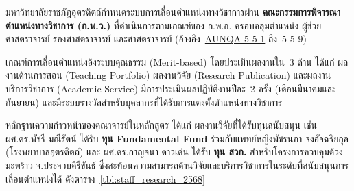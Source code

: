 
มหาวิทยาลัยราชภัฏอุตรดิตถ์กำหนดระบบการเลื่อนตำแหน่งทางวิชาการผ่าน \textbf{คณะกรรมการพิจารณาตำแหน่งทางวิชาการ (ก.พ.ว.)} ที่ดำเนินการตามเกณฑ์ของ ก.พ.อ. ครอบคลุมตำแหน่ง ผู้ช่วยศาสตราจารย์ รองศาสตราจารย์ และศาสตราจารย์ (อ้างอิง~\hyperlink{ref:AUNQA-5-5-1}{AUNQA-5-5-1} ถึง~5-5-9)

เกณฑ์การเลื่อนตำแหน่งอิงระบบคุณธรรม (Merit-based) โดยประเมินผลงานใน~3 ด้าน ได้แก่ ผลงานด้านการสอน (Teaching Portfolio) ผลงานวิจัย (Research Publication) และผลงานบริการวิชาการ (Academic Service) มีการประเมินผลปฏิบัติงานปีละ~2 ครั้ง (เดือนมีนาคมและกันยายน) และมีระบบรางวัลสำหรับบุคลากรที่ได้รับการแต่งตั้งตำแหน่งทางวิชาการ

หลักฐานความก้าวหน้าของคณาจารย์ในหลักสูตร ได้แก่ ผลงานวิจัยที่ได้รับทุนสนับสนุน เช่น ผศ.ดร.พัชรี มณีรัตน์ ได้รับ \textbf{ทุน Fundamental Fund} ร่วมกับแพทย์หญิงพัชรนภา จงอัจฉริยกุล (โรงพยาบาลอุตรดิตถ์) และ ผศ.ดร.กาญจนา ดาวเด่น ได้รับ \textbf{ทุน สวก.} สำหรับโครงการควบคุมด้วงมะพร้าว จ.ประจวบคีรีขันธ์ ซึ่งสะท้อนความสามารถด้านวิจัยและบริการวิชาการในระดับที่สนับสนุนการเลื่อนตำแหน่งได้ ดังตาราง~\ref{tbl:staff_research_2568}

